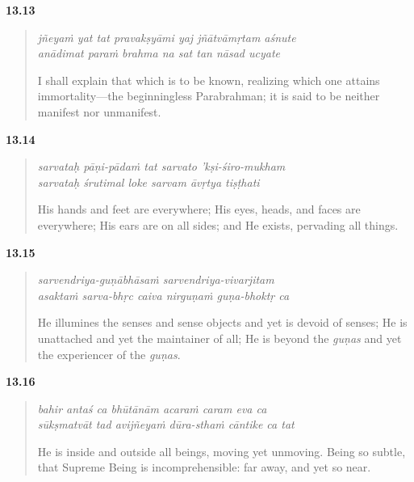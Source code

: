 \par\noindent\textbf{13.13}\par
\begin{verse}
\textit{jñeyaṁ yat tat pravakṣyāmi yaj jñātvāmṛtam aśnute} \\
\textit{anādimat paraṁ brahma na sat tan nāsad ucyate}

\noindent I shall explain that which is to be known, realizing which one attains immortality---the beginningless Parabrahman; it is said to be neither manifest nor unmanifest.
\end{verse}
\par



\par\noindent\textbf{13.14}\par
\begin{verse}
\textit{sarvataḥ pāṇi-pādaṁ tat sarvato ’kṣi-śiro-mukham} \\
\textit{sarvataḥ śrutimal loke sarvam āvṛtya tiṣṭhati}

\noindent His hands and feet are everywhere; His eyes, heads, and faces are everywhere; His ears are on all sides; and He exists, pervading all things.
\end{verse}
\par



\par\noindent\textbf{13.15}\par
\begin{verse}
\textit{sarvendriya-guṇābhāsaṁ sarvendriya-vivarjitam} \\
\textit{asaktaṁ sarva-bhṛc caiva nirguṇaṁ guṇa-bhoktṛ ca}

\noindent He illumines the senses and sense objects and yet is devoid of senses; He is unattached and yet the maintainer of all; He is beyond the \textit{guṇas} and yet the experiencer of the \textit{guṇas}.
\end{verse}
\par



\par\noindent\textbf{13.16}\par
\begin{verse}
\textit{bahir antaś ca bhūtānām acaraṁ caram eva ca} \\
\textit{sūkṣmatvāt tad avijñeyaṁ dūra-sthaṁ cāntike ca tat}

\noindent He is inside and outside all beings, moving yet unmoving. Being so subtle, that Supreme Being is incomprehensible: far away, and yet so near.
\end{verse}
\par



